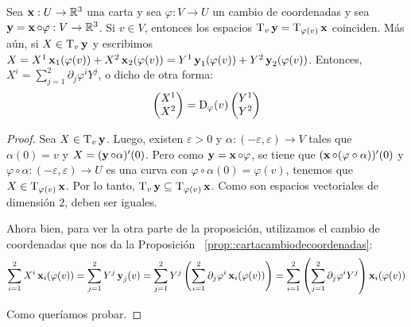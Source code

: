 \begin{prop}
Sea $\operatorname{\mathbf{x}}:U\to\mathbb{R}^3$ una carta y sea $\varphi:V\to U$ un cambio de coordenadas y sea $\operatorname{\mathbf{y}}=\operatorname{\mathbf{x}}\circ\varphi: V\to \mathbb{R}^3$. Si $v\in V$, entonces los espacios $\mathrm{T}_v\operatorname{\mathbf{y}} = \mathrm{T}_{\varphi(v)}\operatorname{\mathbf{x}}$ coinciden. Más aún, si $X\in\mathrm{T}_v\operatorname{\mathbf{y}}$ y escribimos $X = X^1\operatorname{\mathbf{x}}_1(\varphi(v)) + X^2\operatorname{\mathbf{x}}_2(\varphi(v)) = Y^1\operatorname{\mathbf{y}}_1(\varphi(v)) + Y^2\operatorname{\mathbf{y}}_2(\varphi(v))$. Entonces, $X^i = \displaystyle\sum_{j=1}^2 \partial_j\varphi^i Y^j$, o dicho de otra forma: $$\begin{pmatrix}X^1 \\ X^2\end{pmatrix} = \operatorname{\mathrm{D}}_\varphi(v)\begin{pmatrix}Y^1 \\ Y^2\end{pmatrix}$$
\begin{proof}
Sea $X\in\mathrm{T}_v\operatorname{\mathbf{y}}$. Luego, existen $\varepsilon>0$ y $\alpha:(-\varepsilon,\varepsilon)\to V$ tales que $\alpha(0)=v$ y $X=(\operatorname{\mathbf{y}}\circ\alpha)'(0)$. Pero como $\operatorname{\mathbf{y}}=\operatorname{\mathbf{x}}\circ\varphi$, se tiene que $(\operatorname{\mathbf{x}}\circ (\varphi\circ\alpha))'(0)$ y $\varphi\circ\alpha:(-\varepsilon,\varepsilon)\to U$ es una curva con $\varphi\circ\alpha(0)=\varphi(v)$, tenemos que $X\in\mathrm{T}_{\varphi(v)}\operatorname{\mathbf{x}}$. Por lo tanto, $\mathrm{T}_v\operatorname{\mathbf{y}}\subseteq\mathrm{T}_{\varphi(v)}\operatorname{\mathbf{x}}$. Como son espacios vectoriales de dimensión $2$, deben ser iguales.

Ahora bien, para ver la otra parte de la proposición, utilizamos el cambio de coordenadas que nos da la Proposición ~\ref{prop::cartacambiodecoordenadas}: $$\displaystyle\sum_{i=1}^2 X^i \operatorname{\mathbf{x}}_i(\varphi(v)) = \displaystyle\sum_{j=1}^2 Y^j \operatorname{\mathbf{y}}_j(v)=\displaystyle\sum_{j=1}^2 Y^j \left(\displaystyle\sum_{i=1}^2 \partial_j\varphi^i \operatorname{\mathbf{x}}_i(\varphi(v))\right) = \displaystyle\sum_{i=1}^2 \left(\displaystyle\sum_{j=1}^2 \partial_j\varphi^i Y^j\right)\operatorname{\mathbf{x}}_i(\varphi(v))$$

Como queríamos probar.
\end{proof}
\end{prop}

